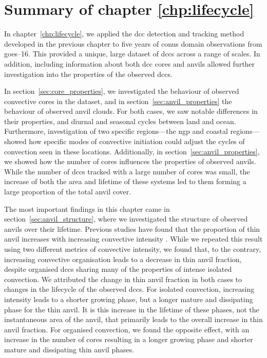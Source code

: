 \section{Summary of chapter \ref{chp:lifecycle}}

In chapter~\ref{chp:lifecycle}, we applied the \acrshort{dcc} detection and tracking method developed in the previous chapter to five years of \acrshort{conus} domain observations from \acrshort{goes}--16.
This provided a unique, large dataset of \acrshort{dcc}s across a range of scales.
In addition, including information about both \acrshort{dcc} cores and anvils allowed further investigation into the properties of the observed \acrshort{dcc}s.

In section~\ref{sec:core_properties}, we investigated the behaviour of observed convective cores in the dataset, and in section~\ref{sec:anvil_properties} the behaviour of observed anvil clouds.
For both cases, we saw notable differences in their properties, and diurnal and seasonal cycles between land and ocean.
Furthermore, investigation of two specific regions---the \acrshort{ngp} and coastal regions---showed how specific modes of convective initiation could adjust the cycles of convection seen in these locations.
Additionally, in section~\ref{sec:anvil_properties}, we showed how the number of cores influences the properties of observed anvils.
While the number of \acrshort{dcc}s tracked with a large number of cores was small, the increase of both the area and lifetime of these systems led to them forming a large proportion of the total anvil cover.

The most important findings in this chapter came in section~\ref{sec:anvil_structure}, where we investigated the structure of observed anvils over their lifetime.
Previous studies have found that the proportion of thin anvil increases with increasing convective intensity \citep{protopapadaki_upper_2017, takahashi_relationships_2017}.
While we repeated this result using two different metrics of convective intensity, we found that, to the contrary, increasing convective organisation leads to a decrease in thin anvil fraction, despite organised \acrshort{dcc}s sharing many of the properties of intense isolated convection.
We attributed the change in thin anvil fraction in both cases to changes in the lifecycle of the observed \acrshort{dcc}s.
For isolated convection, increasing intensity leads to a shorter growing phase, but a longer mature and dissipating phase for the thin anvil.
It is this increase in the lifetime of these phases, not the instantaneous area of the anvil, that primarily leads to the overall increase in thin anvil fraction.
For organised convection, we found the opposite effect, with an increase in the number of cores resulting in a longer growing phase and shorter mature and dissipating thin anvil phases.

